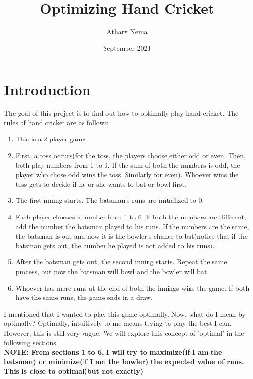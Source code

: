 \documentclass{article}
\title{Optimizing Hand Cricket}
\author{Atharv Nema}
\date{September 2023}
\begin{document}
\maketitle

\section*{Introduction}
The goal of this project is to find out how to optimally play hand cricket.
The rules of hand cricket are as follows:
\begin{enumerate}
    \item This is a 2-player game
    \item First, a toss occurs(for the toss, the players choose either odd or even. Then, both play numbers from 1 to 6. If the sum of both the numbers is odd, the player who chose odd wins the toss. Similarly for even). Whoever wins the toss gets to decide if he or she wants to bat or bowl first.
    \item The first inning starts. The batsman's runs are initialized to 0.
    \item Each player chooses a number from 1 to 6. If both the numbers are different, add the number the batsman played to his runs. If the numbers are the same, the batsman is out and now it is the bowler's chance to bat(notice that if the batsman gets out, the number he played is not added to his runs).
    \item After the batsman gets out, the second inning starts. Repeat the same process, but now the batsman will bowl and the bowler will bat.
    \item Whoever has more runs at the end of both the innings wins the game. If both have the same runs, the game ends in a draw.
\end{enumerate}
I mentioned that I wanted to play this game optimally. Now, what do I mean by optimally? Optimally, intuitively to me means trying to play the best I can. However, this is still very vague. We will explore this concept of 'optimal' in the following sections. 
\\
\textbf{NOTE: From sections 1 to 6, I will try to maximize(if I am the batsman) or minimize(if I am the bowler) the expected value of runs. This is close to optimal(but not exactly)}
\end{document}
